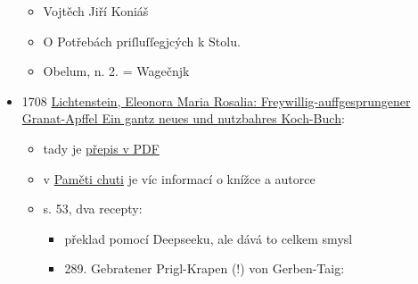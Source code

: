 \begin{itemize}
  \begin{itemize}
  \tightlist
  \item
    Vojtěch Jiří Koniáš
  \item
    O Potřebách priſluſſegjcých k Stolu.
  \item
    Obelum, n. 2. = Wagečnjk
  \end{itemize}
\item
  1708
  \href{https://unipub.uni-graz.at/obvugrdomus_druck/content/titleinfo/8109092}{Lichtenstein,
  Eleonora Maria Rosalia: Freywillig-auffgesprungener Granat-Apffel Ein
  gantz neues und nutzbahres Koch-Buch}:

  \begin{itemize}
  \tightlist
  \item
    tady je
    \href{https://unipub.uni-graz.at/download/pdf/8109092.pdf\#page=54}{přepis
    v PDF}
  \item
    v
    \href{https://kulturni-dejiny.slu.cz/data/uploads/067/upvysledky/pamet_chuti_odborna-kniha_uplatnny_2020.pdf\#page=133}{Paměti
    chuti} je víc informací o knížce a autorce
  \item
    s. 53, dva recepty:

    \begin{itemize}
    \tightlist
    \item
      překlad pomocí Deepseeku, ale dává to celkem smysl
    \item
      289. Gebratener Prigl-Krapen (!) von Gerben-Taig:


\end{itemize}
\end{itemize}
\end{itemize}
